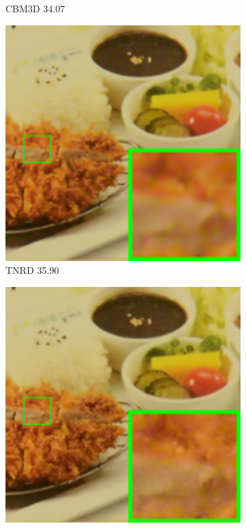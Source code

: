 \begin{figure}
\begin{subfigure}[t]{0.19\textwidth}
		\caption{CBM3D 34.07}
    \end{subfigure}
    \hfill
    \begin{subfigure}[t]{0.19\textwidth}
        \centering
        \includegraphics[width=1\textwidth]{images/mcwnnm/cc/resize_br_TRD_CC15_d800_iso3200_2.png}
\caption{TNRD 35.90}
    \end{subfigure}
    \hfill
    \begin{subfigure}[t]{0.19\textwidth}
        \centering
        \includegraphics[width=1\textwidth]{images/mcwnnm/cc/resize_br_NI_CC15_d800_iso3200_2.png}

\end{subfigure}
\end{figure}
